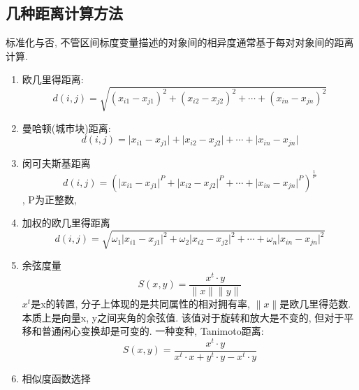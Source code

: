 \documentclass[a4paper,10pt,english]{article}
\begin{document}
\subsection{几种距离计算方法}
标准化与否, 不管区间标度变量描述的对象间的相异度通常基于每对对象间的距离计算.
\begin{enumerate}
\item {欧几里得距离:}
$$ d(i,j)= \sqrt{(x_{i1} - x_{j1})^2 + (x_{i2} - x_{j2})^2 + \cdots + (x_{in} - x_{jn})^2}$$
\item {曼哈顿(城市块)距离:}
$$ d(i,j)= \lvert x_{i1} - x_{j1} \rvert + \lvert x_{i2} - x_{j2} \rvert + \cdots + \lvert x_{in} - x_{jn} \rvert$$
\item {闵可夫斯基距离}
$$ d(i,j)= (\lvert x_{i1} - x_{j1} \rvert^P + \lvert x_{i2} - x_{j2} \rvert^P + \cdots + \lvert x_{in} - x_{jn} \rvert^P)^{\frac{1}{P}}$$, P为正整数, 
\item {加权的欧几里得距离}
$$ d(i,j)= \sqrt{\omega_1\lvert x_{i1} - x_{j1}\rvert^2 + \omega_2\lvert x_{i2} - x_{j2}\rvert^2 + \cdots + \omega_n\lvert x_{in} - x_{jn}\rvert^2}$$
\item {余弦度量}
$$ S(x, y) = \frac{x^t \cdot y}{\lVert x \rVert \lVert y \rVert}$$
$x^t$是x的转置, 分子上体现的是共同属性的相对拥有率, $\lVert x \rVert$是欧几里得范数. 本质上是向量x, y之间夹角的余弦值. 该值对于旋转和放大是不变的, 但对于平移和普通闲心变换却是可变的. 
一种变种, Tanimoto距离:
$$ S(x, y) = \frac{x^t \cdot y}{x^t \cdot x + y^t \cdot y - x^t \cdot y} $$
\item {相似度函数选择}
\end{enumerate}
\end{document}
